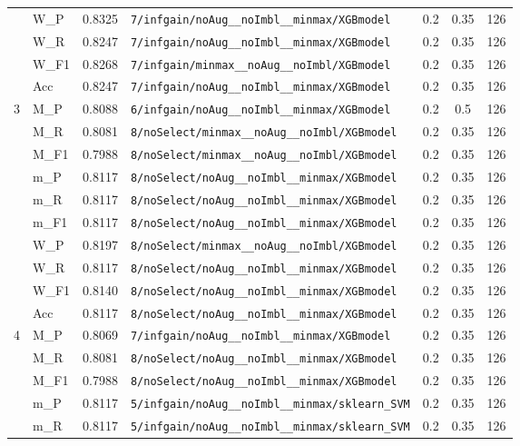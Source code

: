 \begin{table}[htbp]
\begin{tabular}{|c|l|c|>{\ttfamily\footnotesize}p{7.2cm}|c|c|c|}
 & W\_P & 0.8325 & \texttt{7/infgain/noAug\_\_noImbl\_\_minmax/XGBmodel} & 0.2 & 0.35  & 126 \\ 
 & W\_R & 0.8247 & \texttt{7/infgain/noAug\_\_noImbl\_\_minmax/XGBmodel} & 0.2 & 0.35  & 126 \\ 
 & W\_F1 & 0.8268 & \texttt{7/infgain/minmax\_\_noAug\_\_noImbl/XGBmodel} & 0.2 & 0.35  & 126 \\ 
 & Acc & 0.8247 & \texttt{7/infgain/noAug\_\_noImbl\_\_minmax/XGBmodel} & 0.2 & 0.35  & 126 \\ 
\hline
\multirow{10}{*}{3} & M\_P & 0.8088 & \texttt{6/infgain/noAug\_\_noImbl\_\_minmax/XGBmodel} & 0.2 & 0.5  & 126 \\ 
 & M\_R & 0.8081 & \texttt{8/noSelect/minmax\_\_noAug\_\_noImbl/XGBmodel} & 0.2 & 0.35  & 126 \\ 
 & M\_F1 & 0.7988 & \texttt{8/noSelect/minmax\_\_noAug\_\_noImbl/XGBmodel} & 0.2 & 0.35  & 126 \\ 
 & m\_P & 0.8117 & \texttt{8/noSelect/noAug\_\_noImbl\_\_minmax/XGBmodel} & 0.2 & 0.35  & 126 \\ 
 & m\_R & 0.8117 & \texttt{8/noSelect/noAug\_\_noImbl\_\_minmax/XGBmodel} & 0.2 & 0.35  & 126 \\ 
 & m\_F1 & 0.8117 & \texttt{8/noSelect/noAug\_\_noImbl\_\_minmax/XGBmodel} & 0.2 & 0.35  & 126 \\ 
 & W\_P & 0.8197 & \texttt{8/noSelect/minmax\_\_noAug\_\_noImbl/XGBmodel} & 0.2 & 0.35  & 126 \\ 
 & W\_R & 0.8117 & \texttt{8/noSelect/noAug\_\_noImbl\_\_minmax/XGBmodel} & 0.2 & 0.35  & 126 \\ 
 & W\_F1 & 0.8140 & \texttt{8/noSelect/noAug\_\_noImbl\_\_minmax/XGBmodel} & 0.2 & 0.35  & 126 \\ 
 & Acc & 0.8117 & \texttt{8/noSelect/noAug\_\_noImbl\_\_minmax/XGBmodel} & 0.2 & 0.35  & 126 \\ 
\hline
\multirow{10}{*}{4} & M\_P & 0.8069 & \texttt{7/infgain/noAug\_\_noImbl\_\_minmax/XGBmodel} & 0.2 & 0.35  & 126 \\ 
 & M\_R & 0.8081 & \texttt{8/noSelect/noAug\_\_noImbl\_\_minmax/XGBmodel} & 0.2 & 0.35  & 126 \\ 
 & M\_F1 & 0.7988 & \texttt{8/noSelect/noAug\_\_noImbl\_\_minmax/XGBmodel} & 0.2 & 0.35  & 126 \\ 
 & m\_P & 0.8117 & \texttt{5/infgain/noAug\_\_noImbl\_\_minmax/sklearn\_SVM} & 0.2 & 0.35  & 126 \\ 
 & m\_R & 0.8117 & \texttt{5/infgain/noAug\_\_noImbl\_\_minmax/sklearn\_SVM} & 0.2 & 0.35  & 126 \\ 

\end{tabular}
\end{table}
